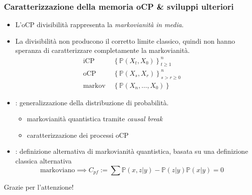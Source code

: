 \documentclass{beamer}
\begin{document}
\begin{frame}
\frametitle{Caratterizzazione della memoria oCP \& sviluppi ulteriori}
\begin{itemize}
\item<1-> L'oCP divisibilità rappresenta la \emph{markovianità in media}. 

\item<2-> La divisibilità non producono il corretto limite classico, quindi non hanno speranza di caratterizzare completamente la markovianità.
\begin{align*}
\text{iCP }&\left\{\mathbb{P}\left(X_{t},X_0\right)\right\}^n_{t\ge 1} \\
\text{oCP }&\left\{\mathbb{P}\left(X_{s},X_r\right)\right\}^n_{s>r \ge 0} \\
\text{markov }&\left\{\mathbb{P}\left(X_{n},\dots,X_0\right)\right\}
\end{align*}

\item<3->  \cite{markovcondition}: generalizzazione della distribuzione di  probabilità.
\begin{itemize}
	\item markovianità quantistica tramite \emph{causal break}
	\item caratterizzazione dei processi oCP
\end{itemize}

\item<4->  \cite{budini2018quantum}: definizione alternativa di markovianità quantistica, basata su una definizione classica alternativa
\[\text{markoviano}\implies C_{pf} := \sum \mathbb{P}(x,z|y)-\mathbb{P}(z|y)\mathbb{P}(x|y)=0\]
\end{itemize}
\end{frame}

\begin{frame}

\centerline{\huge Grazie per l'attenzione!} 

\vfill
\textbf{}
\printbibliography
\centerline{\resizebox{2.3cm}{!}{}}

\end{frame}
\end{document}
